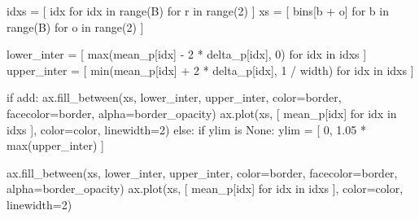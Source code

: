 \documentclass[
  letterpaper,
  DIV=11,
  numbers=noendperiod]{scrartcl}
\newenvironment{Shaded}{\begin{snugshade}}{\end{snugshade}}
\newcommand{\BuiltInTok}[1]{\textcolor[rgb]{0.00,0.23,0.31}{#1}}
\newcommand{\ControlFlowTok}[1]{\textcolor[rgb]{0.00,0.23,0.31}{#1}}
\newcommand{\DecValTok}[1]{\textcolor[rgb]{0.68,0.00,0.00}{#1}}
\newcommand{\FloatTok}[1]{\textcolor[rgb]{0.68,0.00,0.00}{#1}}
\newcommand{\KeywordTok}[1]{\textcolor[rgb]{0.00,0.23,0.31}{#1}}
\newcommand{\NormalTok}[1]{\textcolor[rgb]{0.00,0.23,0.31}{#1}}
\newcommand{\OperatorTok}[1]{\textcolor[rgb]{0.37,0.37,0.37}{#1}}
\newcommand{\VariableTok}[1]{\textcolor[rgb]{0.07,0.07,0.07}{#1}}
\begin{document}
\begin{Shaded}
\begin{Highlighting}[]
\NormalTok{  idxs }\OperatorTok{=}\NormalTok{ [ idx }\ControlFlowTok{for}\NormalTok{ idx }\KeywordTok{in} \BuiltInTok{range}\NormalTok{(B) }\ControlFlowTok{for}\NormalTok{ r }\KeywordTok{in} \BuiltInTok{range}\NormalTok{(}\DecValTok{2}\NormalTok{) ]}
\NormalTok{  xs }\OperatorTok{=}\NormalTok{ [ bins[b }\OperatorTok{+}\NormalTok{ o] }\ControlFlowTok{for}\NormalTok{ b }\KeywordTok{in} \BuiltInTok{range}\NormalTok{(B) }\ControlFlowTok{for}\NormalTok{ o }\KeywordTok{in} \BuiltInTok{range}\NormalTok{(}\DecValTok{2}\NormalTok{) ]}
  
\NormalTok{  lower\_inter }\OperatorTok{=}\NormalTok{ [ }\BuiltInTok{max}\NormalTok{(mean\_p[idx] }\OperatorTok{{-}} \DecValTok{2} \OperatorTok{*}\NormalTok{ delta\_p[idx], }\DecValTok{0}\NormalTok{)}
                  \ControlFlowTok{for}\NormalTok{ idx }\KeywordTok{in}\NormalTok{ idxs ]}
\NormalTok{  upper\_inter }\OperatorTok{=}\NormalTok{ [ }\BuiltInTok{min}\NormalTok{(mean\_p[idx] }\OperatorTok{+} \DecValTok{2} \OperatorTok{*}\NormalTok{ delta\_p[idx], }\DecValTok{1} \OperatorTok{/}\NormalTok{ width) }
                  \ControlFlowTok{for}\NormalTok{ idx }\KeywordTok{in}\NormalTok{ idxs ]}
  
  \ControlFlowTok{if}\NormalTok{ add:}
\NormalTok{    ax.fill\_between(xs, lower\_inter, upper\_inter,}
\NormalTok{                    color}\OperatorTok{=}\NormalTok{border, facecolor}\OperatorTok{=}\NormalTok{border,}
\NormalTok{                    alpha}\OperatorTok{=}\NormalTok{border\_opacity)}
\NormalTok{    ax.plot(xs, [ mean\_p[idx] }\ControlFlowTok{for}\NormalTok{ idx }\KeywordTok{in}\NormalTok{ idxs ],}
\NormalTok{            color}\OperatorTok{=}\NormalTok{color, linewidth}\OperatorTok{=}\DecValTok{2}\NormalTok{)}
  \ControlFlowTok{else}\NormalTok{:}
    \ControlFlowTok{if}\NormalTok{ ylim }\KeywordTok{is} \VariableTok{None}\NormalTok{:}
\NormalTok{      ylim }\OperatorTok{=}\NormalTok{ [ }\DecValTok{0}\NormalTok{, }\FloatTok{1.05} \OperatorTok{*} \BuiltInTok{max}\NormalTok{(upper\_inter) ]}

\NormalTok{    ax.fill\_between(xs, lower\_inter, upper\_inter,}
\NormalTok{                    color}\OperatorTok{=}\NormalTok{border, facecolor}\OperatorTok{=}\NormalTok{border,}
\NormalTok{                    alpha}\OperatorTok{=}\NormalTok{border\_opacity)}
\NormalTok{    ax.plot(xs, [ mean\_p[idx] }\ControlFlowTok{for}\NormalTok{ idx }\KeywordTok{in}\NormalTok{ idxs ],}
\NormalTok{            color}\OperatorTok{=}\NormalTok{color, linewidth}\OperatorTok{=}\DecValTok{2}\NormalTok{)}


\end{Highlighting}
\end{Shaded}
\end{document}
